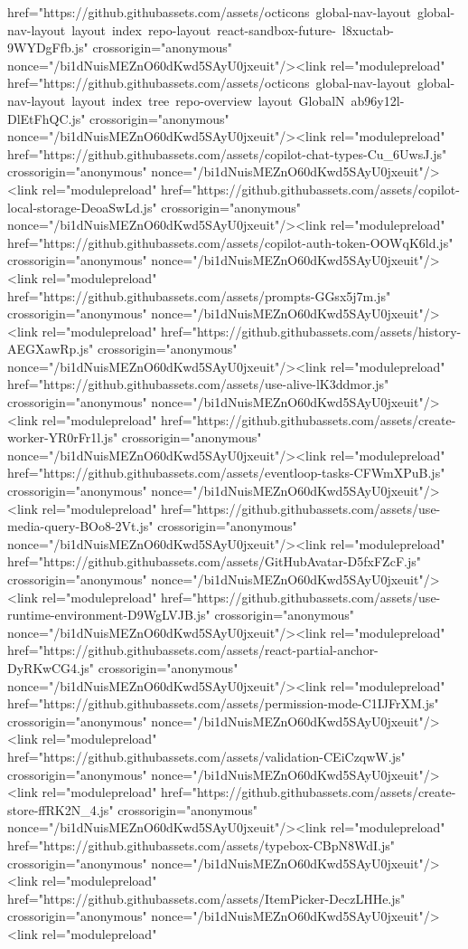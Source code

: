 href="https://github.githubassets.com/assets/octicons~global-nav-layout~global-nav-layout~layout~index~repo-layout~react-sandbox-future-~l8xuctab-9WYDgFfb.js" crossorigin="anonymous" nonce="/bi1dNuisMEZnO60dKwd5SAyU0jxeuit"/><link rel="modulepreload" href="https://github.githubassets.com/assets/octicons~global-nav-layout~global-nav-layout~layout~index~tree~repo-overview~layout~GlobalN~ab96y12l-DlEtFhQC.js" crossorigin="anonymous" nonce="/bi1dNuisMEZnO60dKwd5SAyU0jxeuit"/><link rel="modulepreload" href="https://github.githubassets.com/assets/copilot-chat-types-Cu_6UwsJ.js" crossorigin="anonymous" nonce="/bi1dNuisMEZnO60dKwd5SAyU0jxeuit"/><link rel="modulepreload" href="https://github.githubassets.com/assets/copilot-local-storage-DeoaSwLd.js" crossorigin="anonymous" nonce="/bi1dNuisMEZnO60dKwd5SAyU0jxeuit"/><link rel="modulepreload" href="https://github.githubassets.com/assets/copilot-auth-token-OOWqK6ld.js" crossorigin="anonymous" nonce="/bi1dNuisMEZnO60dKwd5SAyU0jxeuit"/><link rel="modulepreload" href="https://github.githubassets.com/assets/prompts-GGsx5j7m.js" crossorigin="anonymous" nonce="/bi1dNuisMEZnO60dKwd5SAyU0jxeuit"/><link rel="modulepreload" href="https://github.githubassets.com/assets/history-AEGXawRp.js" crossorigin="anonymous" nonce="/bi1dNuisMEZnO60dKwd5SAyU0jxeuit"/><link rel="modulepreload" href="https://github.githubassets.com/assets/use-alive-lK3ddmor.js" crossorigin="anonymous" nonce="/bi1dNuisMEZnO60dKwd5SAyU0jxeuit"/><link rel="modulepreload" href="https://github.githubassets.com/assets/create-worker-YR0rFr1l.js" crossorigin="anonymous" nonce="/bi1dNuisMEZnO60dKwd5SAyU0jxeuit"/><link rel="modulepreload" href="https://github.githubassets.com/assets/eventloop-tasks-CFWmXPuB.js" crossorigin="anonymous" nonce="/bi1dNuisMEZnO60dKwd5SAyU0jxeuit"/><link rel="modulepreload" href="https://github.githubassets.com/assets/use-media-query-BOo8-2Vt.js" crossorigin="anonymous" nonce="/bi1dNuisMEZnO60dKwd5SAyU0jxeuit"/><link rel="modulepreload" href="https://github.githubassets.com/assets/GitHubAvatar-D5fxFZcF.js" crossorigin="anonymous" nonce="/bi1dNuisMEZnO60dKwd5SAyU0jxeuit"/><link rel="modulepreload" href="https://github.githubassets.com/assets/use-runtime-environment-D9WgLVJB.js" crossorigin="anonymous" nonce="/bi1dNuisMEZnO60dKwd5SAyU0jxeuit"/><link rel="modulepreload" href="https://github.githubassets.com/assets/react-partial-anchor-DyRKwCG4.js" crossorigin="anonymous" nonce="/bi1dNuisMEZnO60dKwd5SAyU0jxeuit"/><link rel="modulepreload" href="https://github.githubassets.com/assets/permission-mode-C1IJFrXM.js" crossorigin="anonymous" nonce="/bi1dNuisMEZnO60dKwd5SAyU0jxeuit"/><link rel="modulepreload" href="https://github.githubassets.com/assets/validation-CEiCzqwW.js" crossorigin="anonymous" nonce="/bi1dNuisMEZnO60dKwd5SAyU0jxeuit"/><link rel="modulepreload" href="https://github.githubassets.com/assets/create-store-ffRK2N_4.js" crossorigin="anonymous" nonce="/bi1dNuisMEZnO60dKwd5SAyU0jxeuit"/><link rel="modulepreload" href="https://github.githubassets.com/assets/typebox-CBpN8WdI.js" crossorigin="anonymous" nonce="/bi1dNuisMEZnO60dKwd5SAyU0jxeuit"/><link rel="modulepreload" href="https://github.githubassets.com/assets/ItemPicker-DeczLHHe.js" crossorigin="anonymous" nonce="/bi1dNuisMEZnO60dKwd5SAyU0jxeuit"/><link rel="modulepreload" 